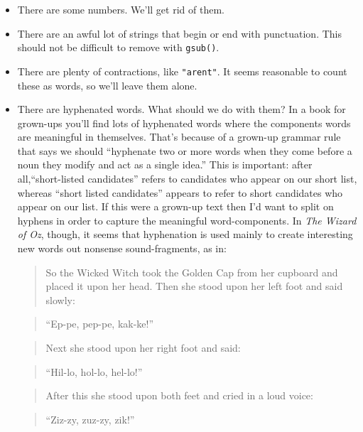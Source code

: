 \documentclass[]{book}
\theoremstyle{definition}
\theoremstyle{definition}
\theoremstyle{definition}
\theoremstyle{remark}
\begin{document}
{\begin{itemize}
\item
  There are some numbers. We'll get rid of them.
\item
  There are an awful lot of strings that begin or end with punctuation.
  This should not be difficult to remove with \texttt{gsub()}.
\item
  There are plenty of contractions, like
  \texttt{"aren\textquotesingle{}t"}. It seems reasonable to count these
  as words, so we'll leave them alone.
\item
  There are hyphenated words. What should we do with them? In a book for
  grown-ups you'll find lots of hyphenated words where the components
  words are meaningful in themselves. That's because of a grown-up
  grammar rule that says we should ``hyphenate two or more words when
  they come before a noun they modify and act as a single idea.'' This
  is important: after all,``short-listed candidates'' refers to
  candidates who appear on our short list, whereas ``short listed
  candidates'' appears to refer to short candidates who appear on our
  list. If this were a grown-up text then I'd want to split on hyphens
  in order to capture the meaningful word-components. In \emph{The
  Wizard of Oz}, though, it seems that hyphenation is used mainly to
  create interesting new words out nonsense sound-fragments, as in:

  \begin{quote}
  So the Wicked Witch took the Golden Cap from her cupboard and placed
  it upon her head. Then she stood upon her left foot and said slowly:
  \end{quote}

  \begin{quote}
  ``Ep-pe, pep-pe, kak-ke!''
  \end{quote}

  \begin{quote}
  Next she stood upon her right foot and said:
  \end{quote}

  \begin{quote}
  ``Hil-lo, hol-lo, hel-lo!''
  \end{quote}

  \begin{quote}
  After this she stood upon both feet and cried in a loud voice:
  \end{quote}

  \begin{quote}
  ``Ziz-zy, zuz-zy, zik!''
  \end{quote}


\end{itemize}}
\end{document}

